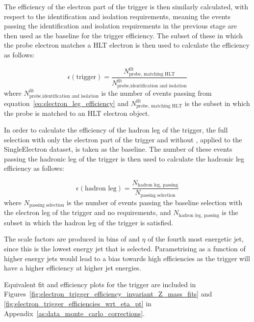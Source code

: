 The efficiency of the electron part of the trigger is then similarly calculated, with respect to the
identification and isolation requirements, meaning the events passing the identification and isolation
requirements in the previous stage are then used as the baseline for the trigger efficiency. The subset of
these in which the probe electron matches a HLT electron is then used to calculate the efficiency as follows:

\begin{equation}
\epsilon(\text{trigger}) = \frac{N^{\text{fit}}_{\text{probe, matching HLT}}}{N^{\text{fit}}_{\text{probe,identification and isolation}}}
\label{eq:electron_leg_efficiency}
\end{equation}
where $N^{\text{fit}}_{\text{probe,identification and isolation}}$ is the number of
events passing from equation~\ref{eq:electron_leg_efficiency} and $N^{\text{fit}}_{\text{probe, matching
HLT}}$ is the subset in which the probe is matched to an HLT electron object.

In order to calculate the efficiency of the hadron leg of the trigger, the full selection with only the
electron part of the trigger and without \btagging, applied to the SingleElectron dataset, is taken as the
baseline. The number of these events passing the hadronic leg of the trigger is then used to calculate the
hadronic leg efficiency as follows:

\begin{equation}
\epsilon(\text{hadron leg}) = \frac{N_{\text{hadron leg, passing}}}{N_{\text{passing selection}}}
\end{equation}
where $N_{\text{passing selection}}$ is the number of events passing the baseline selection with
the electron leg of the trigger and no \btagging requirements, and $N_{\text{hadron leg, passing}}$ is the
subset in which the hadron leg of the trigger is satisfied.

The scale factors are produced in bins of \pt and $\eta$ of the fourth most energetic jet, since this is the
lowest energy jet that is selected. Parametrising as a function of higher energy jets would lead to a bias
towards high efficiencies as the trigger will have a higher efficiency at higher jet energies.

Equivalent fit and efficiency plots for the trigger are included in
Figures~\ref{fig:electron_trigger_efficiency_invariant_Z_mass_fits} and
\ref{fig:electron_trigger_efficiencies_wrt_eta_pt} in Appendix~\ref{as:data_monte_carlo_corrections}.

